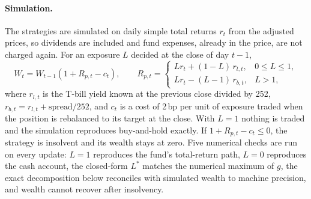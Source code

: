 \documentclass[11pt,a4paper]{article}
\begin{document}
\paragraph{Simulation.} The strategies are simulated on daily simple total returns $r_t$ from the adjusted prices, so dividends are included and fund expenses, already in the price, are not charged again. For an exposure $L$ decided at the close of day $t-1$,
\[
W_t = W_{t-1}\left(1 + R_{p,t} - c_t\right), \qquad R_{p,t} = \begin{cases} L r_t + (1-L)\, r_{l,t}, & 0\le L\le1,\\ L r_t - (L-1)\, r_{b,t}, & L>1, \end{cases}
\]
where $r_{l,t}$ is the T-bill yield known at the previous close divided by 252, $r_{b,t} = r_{l,t} + \text{spread}/252$, and $c_t$ is a cost of 2\,bp per unit of exposure traded when the position is rebalanced to its target at the close. With $L=1$ nothing is traded and the simulation reproduces buy-and-hold exactly. If $1 + R_{p,t} - c_t \le 0$, the strategy is insolvent and its wealth stays at zero. Five numerical checks are run on every update: $L=1$ reproduces the fund's total-return path, $L=0$ reproduces the cash account, the closed-form $L^*$ matches the numerical maximum of $g$, the exact decomposition below reconciles with simulated wealth to machine precision, and wealth cannot recover after insolvency.
\end{document}
